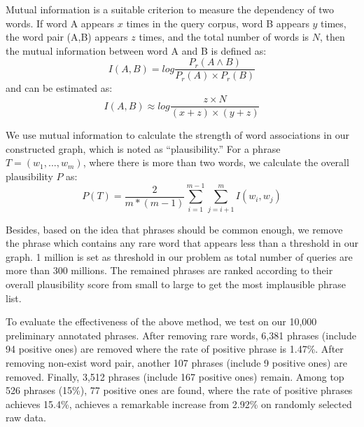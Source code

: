Mutual information is a suitable criterion to measure the dependency of two words. 
If word A appears $x$ times in the query corpus, word B appears $y$ times, 
the word pair (A,B) appears $z$ times, and the total number of words is $N$, then the mutual information between word A and B is defined as:
\begin{equation}
I(A,B) = log\frac{P_r(A\wedge B)}{P_r(A)\times P_r(B)}
\end{equation}
and can be estimated as:%
\begin{equation}
I(A,B) \approx log\frac{z\times N}{(x+z)\times (y+z)}
\end{equation}

We use mutual information to calculate the strength of word associations in 
our constructed graph, which is noted as ``plausibility.''
For a phrase $T=(w_1, ..., w_m)$, %
where there is more than two words, 
we calculate the overall plausibility $P$ as:
\begin{equation}
P(T) = \frac{2}{m*(m-1)}\sum_{i=1}^{m-1}\sum_{j=i+1}^{m}I(w_i, w_j)
\end{equation}

Besides, based on the idea that phrases should be common enough,
we remove the phrase which contains any rare word that appears less than a threshold in our graph.
1 million is set as threshold in our problem as total number of queries are more than 300 millions.   %
The remained phrases are ranked according to their overall plausibility score from small to large to get the most implausible phrase list.

To evaluate the effectiveness of the above method, we test on our 10,000 preliminary annotated phrases. %
After removing rare words, 6,381 phrases (include 94 positive ones) are removed where the rate of positive phrase is 1.47\%. After removing non-exist word pair, another 107 phrases (include 9 positive ones) are removed. Finally, 3,512 phrases (include 167 positive ones) remain. Among top 526 phrases (15\%), 77 positive ones are found, where the rate of positive phrases achieves 15.4\%, %
achieves a remarkable increase from 2.92\% on randomly selected raw data.

